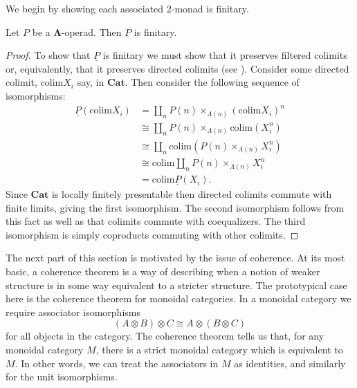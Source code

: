 \documentclass{amsbook} %
\newcommand{\ML}{\mathbf{\Lambda}}
\numberwithin{section}{chapter}
\begin{document}
We begin by showing each associated $2$-monad is finitary.
\begin{prop}
Let $P$ be a $\ML$-operad. Then $\underline{P}$ is finitary.
\end{prop}
\begin{proof}
To show that $\underline{P}$ is finitary we must show that it preserves filtered colimits or, equivalently, that it preserves directed colimits (see \cite{ar}). Consider some directed colimit, $\text{colim}X_{i}$ say, in $\mathbf{Cat}$. Then consider the following sequence of isomorphisms:
    \begin{align*}
      \underline{P}(\text{colim}X_{i}) &= \coprod_n P(n) \times_{\Lambda(n)} (\text{colim}X_{i})^n \\
      &\cong \coprod_n P(n) \times_{\Lambda(n)} \text{colim}(X_{i}^n) \\
      &\cong \coprod_n \text{colim}(P(n) \times_{\Lambda(n)} X_{i}^n) \\
      &\cong \text{colim}\coprod_n P(n) \times_{\Lambda(n)} X_{i}^n \\
      &= \text{colim}\underline{P}(X_{i}).
    \end{align*}
Since $\mathbf{Cat}$ is locally finitely presentable then directed colimits commute with finite limits, giving the first isomorphism. The second isomorphism follows from this fact as well as that colimits commute with coequalizers. The third isomorphism is simply coproducts commuting with other colimits.
\end{proof}

The next part of this section is motivated by the issue of coherence. At its most basic, a coherence theorem is a way of describing when a notion of weaker structure is in some way equivalent to a stricter structure. The prototypical case here is the coherence theorem for monoidal categories. In a monoidal category we require associator isomorphisms
    \[
        \left( A \otimes B \right) \otimes C \cong A \otimes \left( B \otimes C \right)
    \]
for all objects in the category. The coherence theorem tells us that, for any monoidal category $M$, there is a strict monoidal category which is equivalent to $M$.  In other words, we can treat the associators in $M$ as identities, and similarly for the unit isomorphisms.
\end{document}
